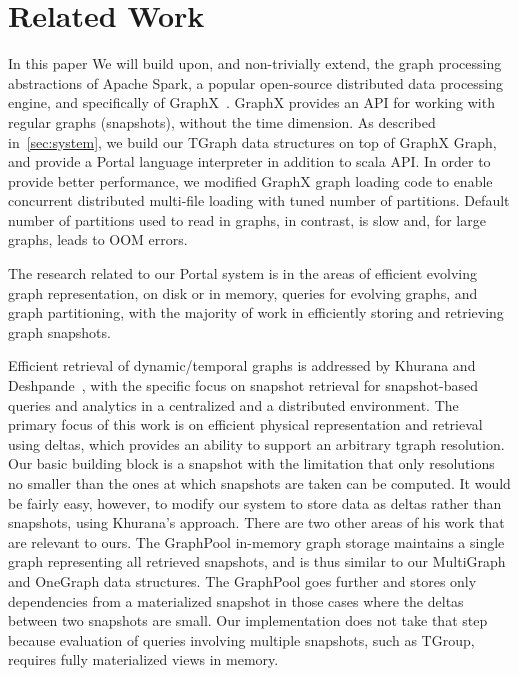 \section{Related Work}
\label{sec:related}

In this paper We will build upon, and non-trivially extend, the graph
processing abstractions of Apache Spark, a popular open-source
distributed data processing engine, and specifically of
GraphX~\cite{DBLP:conf/osdi/GonzalezXDCFS14}.  GraphX provides an API
for working with regular graphs (snapshots), without the time
dimension.  As described in~\ref{sec:system}, we build our TGraph data
structures on top of GraphX Graph, and provide a Portal language
interpreter in addition to scala API.  In order to provide better
performance, we modified GraphX graph loading code to enable
concurrent distributed multi-file loading with tuned number of
partitions.  Default number of partitions used to read in graphs, in
contrast, is slow and, for large graphs, leads to OOM errors. 

The research related to our Portal system is in the areas of efficient
evolving graph representation, on disk or in memory, queries for
evolving graphs, and graph partitioning, with the majority of work in
efficiently storing and retrieving graph snapshots.

Efficient retrieval of dynamic/temporal graphs is addressed by Khurana
and Deshpande~\cite{Khurana2003}, with the specific focus on snapshot
retrieval for snapshot-based queries and analytics in a centralized
and a distributed environment.  The primary focus of this work is on
efficient physical representation and retrieval using deltas, which
provides an ability to support an arbitrary tgraph resolution.  Our
basic building block is a snapshot with the limitation that only
resolutions no smaller than the ones at which snapshots are taken can
be computed.  It would be fairly easy, however, to modify our system
to store data as deltas rather than snapshots, using Khurana's
approach.  There are two other areas of his work that are relevant to
ours.  The GraphPool in-memory graph storage maintains a single graph
representing all retrieved snapshots, and is thus similar to our
MultiGraph and OneGraph data structures.  The GraphPool goes further
and stores only dependencies from a materialized snapshot in those
cases where the deltas between two snapshots are small.  Our
implementation does not take that step because evaluation of queries
involving multiple snapshots, such as TGroup, requires fully
materialized views in memory.

